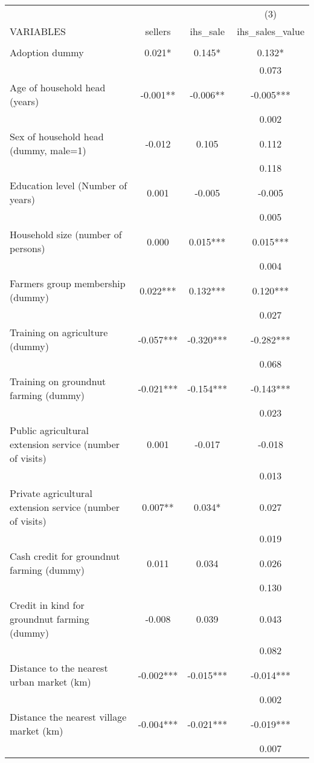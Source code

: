 \documentclass[]{article}
\begin{document}
\begin{tabular}{lccc} \hline
 &  &  & (3) \\
VARIABLES & sellers & ihs\_sale & ihs\_sales\_value \\ \hline
 &  &  &  \\
Adoption dummy & 0.021* & 0.145* & 0.132* \\
 &  &  & 0.073 \\
Age of household head (years) & -0.001** & -0.006** & -0.005*** \\
 &  &  & 0.002 \\
Sex of household head (dummy, male=1) & -0.012 & 0.105 & 0.112 \\
 &  &  & 0.118 \\
Education level (Number of years) & 0.001 & -0.005 & -0.005 \\
 &  &  & 0.005 \\
Household size (number of persons) & 0.000 & 0.015*** & 0.015*** \\
 &  &  & 0.004 \\
Farmers group membership (dummy) & 0.022*** & 0.132*** & 0.120*** \\
 &  &  & 0.027 \\
Training on agriculture (dummy) & -0.057*** & -0.320*** & -0.282*** \\
 &  &  & 0.068 \\
Training on groundnut farming (dummy) & -0.021*** & -0.154*** & -0.143*** \\
 &  &  & 0.023 \\
Public agricultural extension service (number of visits) & 0.001 & -0.017 & -0.018 \\
 &  &  & 0.013 \\
Private agricultural extension service (number of visits) & 0.007** & 0.034* & 0.027 \\
 &  &  & 0.019 \\
Cash credit for groundnut farming (dummy) & 0.011 & 0.034 & 0.026 \\
 &  &  & 0.130 \\
Credit in kind for groundnut farming (dummy) & -0.008 & 0.039 & 0.043 \\
 &  &  & 0.082 \\
Distance to the nearest urban market (km) & -0.002*** & -0.015*** & -0.014*** \\
 &  &  & 0.002 \\
Distance the nearest village market (km) & -0.004*** & -0.021*** & -0.019*** \\
 &  &  & 0.007 \\

\end{tabular}
\end{document}

